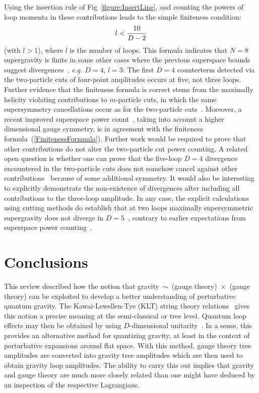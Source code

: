 Using the insertion rule of Fig~\ref{figure:InsertLine}, 
and counting the powers of loop momenta in these contributions 
leads to the simple finiteness condition:
%
\begin{equation}
l < {10 \over D-2}
\label{FinitenessFormuala}
\end{equation}
%
(with $l>1$), where $l$ is the number of loops.  This formula
indicates that $N=8$ supergravity is finite in some other cases where
the previous superspace bounds suggest divergences~\cite{Howe89}, {\it
e.g.} $D=4$, $l=3$: The first $D=4$ counterterm detected via the
two-particle cuts of four-point amplitudes occurs at five, not three
loops.  Further evidence that the finiteness formula is correct stems
from the maximally helicity violating contributions to $m$-particle
cuts, in which the same supersymmetry cancellations occur as for the
two-particle cuts~\cite{BDDPR}.  Moreover, a recent improved
superspace power count~\cite{Stelle}, taking into account a higher
dimensional gauge symmetry, is in agreement with the finiteness
formula~(\ref{FinitenessFormuala}).  Further work would be required to
prove that other contributions do not alter the two-particle cut power
counting.  A related open question is whether one can prove that the
five-loop $D=4$ divergence encountered in the two-particle cuts does not
somehow cancel against other contributions~\cite{ChalmersN8} because
of some additional symmetry.  It would also be interesting to
explicitly demonstrate the non-existence of divergences after
including all contributions to the three-loop amplitude.  In any case,
the explicit calculations using cutting methods do establish that at
two loops maximally supersymmetric supergravity does not diverge in
$D=5$~\cite{BDDPR}, contrary to earlier expectations from superspace
power counting~\cite{Howe89}.

\newpage

\section{Conclusions}
\label{section:conclusions}

This review described how the notion that gravity~$\sim$~(gauge
theory)~$\times$~(gauge theory) can be exploited to develop a better
understanding of perturbative quantum gravity.  The Kawai-Lewellen-Tye
(KLT) string theory relations~\cite{KLT} gives this notion a precise meaning 
at the semi-classical or tree level.  Quantum loop effects
may then be obtained by using $D$-dimensional
unitarity~\cite{Bern94SusyFour,Bern95SusyFour,BernMorgan,Review}.  In
a sense, this provides an alternative method for quantizing gravity,
at least in the context of perturbative expansions around flat space.
With this method, gauge theory tree amplitudes are converted into
gravity tree amplitudes which are then used to obtain gravity loop
amplitudes.  The ability to carry this out implies that gravity and
gauge theory are much more closely related than one might have deduced
by an inspection of the respective Lagrangians.

